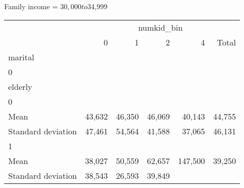 Family income = $30,000 to $34,999
\begin{tabular}{llllll}
\cline{1-6}
\multicolumn{1}{c}{} &
  \multicolumn{5}{|c}{numkid\_bin} \\
\multicolumn{1}{c}{} &
  \multicolumn{1}{|r}{0} &
  \multicolumn{1}{r}{1} &
  \multicolumn{1}{r}{2} &
  \multicolumn{1}{r}{4} &
  \multicolumn{1}{r}{Total} \\
\cline{1-6}
\multicolumn{1}{l}{marital} &
  \multicolumn{1}{|r}{} &
  \multicolumn{1}{r}{} &
  \multicolumn{1}{r}{} &
  \multicolumn{1}{r}{} &
  \multicolumn{1}{r}{} \\
\multicolumn{1}{l}{\hspace{1em}0} &
  \multicolumn{1}{|r}{} &
  \multicolumn{1}{r}{} &
  \multicolumn{1}{r}{} &
  \multicolumn{1}{r}{} &
  \multicolumn{1}{r}{} \\
\multicolumn{1}{l}{\hspace{2em}elderly} &
  \multicolumn{1}{|r}{} &
  \multicolumn{1}{r}{} &
  \multicolumn{1}{r}{} &
  \multicolumn{1}{r}{} &
  \multicolumn{1}{r}{} \\
\multicolumn{1}{l}{\hspace{3em}0} &
  \multicolumn{1}{|r}{} &
  \multicolumn{1}{r}{} &
  \multicolumn{1}{r}{} &
  \multicolumn{1}{r}{} &
  \multicolumn{1}{r}{} \\
\multicolumn{1}{l}{\hspace{4em}Mean} &
  \multicolumn{1}{|r}{43,632} &
  \multicolumn{1}{r}{46,350} &
  \multicolumn{1}{r}{46,069} &
  \multicolumn{1}{r}{40,143} &
  \multicolumn{1}{r}{44,755} \\
\multicolumn{1}{l}{\hspace{4em}Standard deviation} &
  \multicolumn{1}{|r}{47,461} &
  \multicolumn{1}{r}{54,564} &
  \multicolumn{1}{r}{41,588} &
  \multicolumn{1}{r}{37,065} &
  \multicolumn{1}{r}{46,131} \\
\multicolumn{1}{l}{\hspace{3em}1} &
  \multicolumn{1}{|r}{} &
  \multicolumn{1}{r}{} &
  \multicolumn{1}{r}{} &
  \multicolumn{1}{r}{} &
  \multicolumn{1}{r}{} \\
\multicolumn{1}{l}{\hspace{4em}Mean} &
  \multicolumn{1}{|r}{38,027} &
  \multicolumn{1}{r}{50,559} &
  \multicolumn{1}{r}{62,657} &
  \multicolumn{1}{r}{147,500} &
  \multicolumn{1}{r}{39,250} \\
\multicolumn{1}{l}{\hspace{4em}Standard deviation} &
  \multicolumn{1}{|r}{38,543} &
  \multicolumn{1}{r}{26,593} &
  \multicolumn{1}{r}{39,849} &

\end{tabular}
